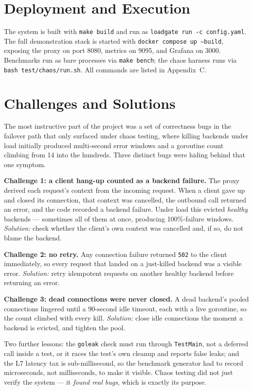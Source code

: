 \documentclass[11pt,a4paper]{report}
\newcommand{\code}[1]{\texttt{#1}}
\begin{document}
\section{Deployment and Execution}
The system is built with \code{make build} and run as \code{loadgate run -c config.yaml}. The
full demonstration stack is started with \code{docker compose up --build}, exposing the proxy on
port 8080, metrics on 9095, and Grafana on 3000. Benchmarks run as bare processes via
\code{make bench}; the chaos harness runs via \code{bash test/chaos/run.sh}. All commands are
listed in Appendix~C.

\section{Challenges and Solutions}
\label{sec:testing-impl}
The most instructive part of the project was a set of correctness bugs in the failover path that
only surfaced under chaos testing, where killing backends under load initially produced
multi-second error windows and a goroutine count climbing from 14 into the hundreds. Three
distinct bugs were hiding behind that one symptom.

\textbf{Challenge 1: a client hang-up counted as a backend failure.} The proxy derived each
request's context from the incoming request. When a client gave up and closed its connection, that
context was cancelled, the outbound call returned an error, and the code recorded a backend
failure. Under load this evicted \emph{healthy} backends --- sometimes all of them at once,
producing 100\%-failure windows. \emph{Solution:} check whether the client's own context was
cancelled and, if so, do not blame the backend.

\textbf{Challenge 2: no retry.} Any connection failure returned \code{502} to the client
immediately, so every request that landed on a just-killed backend was a visible error.
\emph{Solution:} retry idempotent requests on another healthy backend before returning an error.

\textbf{Challenge 3: dead connections were never closed.} A dead backend's pooled connections
lingered until a 90-second idle timeout, each with a live goroutine, so the count climbed with
every kill. \emph{Solution:} close idle connections the moment a backend is evicted, and tighten
the pool.

Two further lessons: the \code{goleak} check must run through \code{TestMain}, not a deferred call
inside a test, or it races the test's own cleanup and reports false leaks; and the L7 latency
tax is sub-millisecond, so the benchmark generator had to record microseconds, not milliseconds,
to make it visible. Chaos testing did not just verify the system --- it \emph{found real bugs},
which is exactly its purpose.
\end{document}
